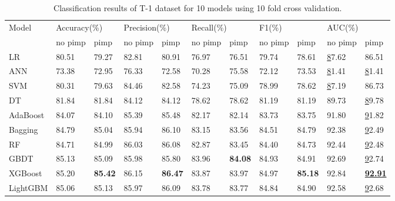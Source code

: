 \documentclass[review]{elsarticle}
\begin{document}
\begin{table}[H]
    \centering
    \caption{Classification results of T-1 dataset for 10 models using 10 fold cross validation.}
    \label{Classification results 1}
    \begin{tabular}{lllllllllll}
    \hline
    \multirow{2}{*}{Model} & \multicolumn{2}{l}{Accuracy(\%)} & \multicolumn{2}{l}{Precision(\%)} & \multicolumn{2}{l}{Recall(\%)} & \multicolumn{2}{l}{F1(\%)} & \multicolumn{2}{l}{AUC(\%)} \\ \cline{2-11}
     & no pimp & pimp & no pimp & pimp & no pimp & pimp & no pimp & pimp & no pimp & pimp \\ \hline
    LR & 80.51 & 79.27 & 82.81 & 80.91 & 76.97 & 76.51 & 79.74 & 78.61 & {\ul 87.62} & 86.51 \\
    ANN & 73.38 & 72.95 & 76.33 & 72.58 & 70.28 & 75.58 & 72.12 & 73.53 & {\ul 81.41} & {\ul 81.41} \\
    SVM & 80.31 & 79.63 & 84.46 & 82.58 & 74.23 & 75.09 & 78.99 & 78.62 & {\ul 87.19} & 86.73 \\
    DT & 81.84 & 81.84 & 84.12 & 84.12 & 78.62 & 78.62 & 81.19 & 81.19 & 89.73 & {\ul 89.78} \\
    AdaBoost & 84.07 & 84.10 & 85.39 & 85.48 & 82.17 & 82.14 & 83.73 & 83.75 & 91.80 & {\ul 91.82} \\
    Bagging & 84.79 & 85.04 & 85.94 & 86.10 & 83.15 & 83.56 & 84.51 & 84.79 & 92.38 & {\ul 92.49} \\
    RF & 84.71 & 84.99 & 86.03 & 86.08 & 82.87 & 83.45 & 84.40 & 84.73 & 92.44 & {\ul 92.48} \\
    GBDT & 85.13 & 85.09 & 85.98 & 85.80 & 83.96 & \textbf{84.08} & 84.93 & 84.91 & 92.69 & {\ul 92.74} \\
    XGBoost & 85.20 & \textbf{85.42} & 86.15 & \textbf{86.47} & 83.87 & 83.97 & 84.97 & \textbf{85.18} & 92.84 & {\ul \textbf{92.91}} \\
    LightGBM & 85.06 & 85.13 & 85.97 & 86.09 & 83.78 & 83.77 & 84.84 & 84.90 & 92.58 & {\ul 92.68} \\ \hline
    \end{tabular}
\end{table}
\end{document}
